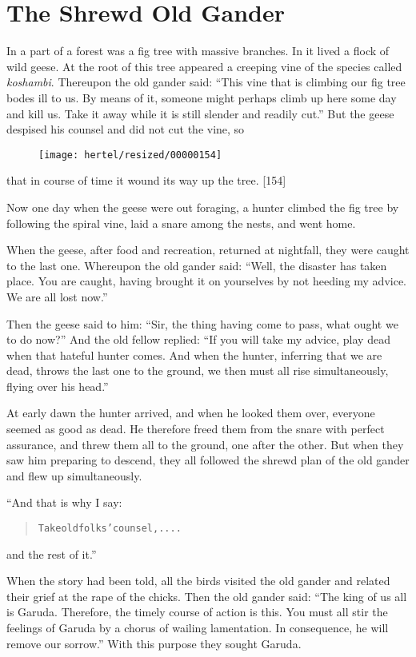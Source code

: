 \documentclass[article, twoside, 10pt]{memoir}
\renewenvironment{verbatim}{%
\begin{quote}%
\vskip -10pt%
\begin{alltt}\normalfont\small}{\end{alltt}%
\end{quote}%
\vskip -10pt
} %
\begin{document}
\chapter{The Shrewd Old Gander}

In a part of a forest was a fig tree with massive branches. In it
lived a flock of wild geese. At the root of this tree appeared a
creeping vine of the species called \emph{koshambi}. Thereupon the
old gander said:
``This vine that is climbing our fig tree bodes ill to us. By means of it, someone might perhaps climb up here some day and kill us. Take it away while it is still slender and readily cut.''
But the geese despised his counsel and did not cut the vine, so
\begin{figure}[p]\texttt{[image: hertel/resized/00000154]}\end{figure}that in course of time it wound its way up the tree. [154]

Now one day when the geese were out foraging, a hunter climbed the
fig tree by following the spiral vine, laid a snare among the
nests, and went home.

When the geese, after food and recreation, returned at nightfall,
they were caught to the last one. Whereupon the old gander said:
``Well, the disaster has taken place. You are caught, having brought it on yourselves by not heeding my advice. We are all lost now.''

Then the geese said to him:
``Sir, the thing having come to pass, what ought we to do now?''
And the old fellow replied:
``If you will take my advice, play dead when that hateful hunter comes. And when the hunter, inferring that we are dead, throws the last one to the ground, we then must all rise simultaneously, flying over his head.''

At early dawn the hunter arrived, and when he looked them over,
everyone seemed as good as dead. He therefore freed them from the
snare with perfect assurance, and threw them all to the ground, one
after the other. But when they saw him preparing to descend, they
all followed the shrewd plan of the old gander and flew up
simultaneously.

“And that is why I say:

\begin{verbatim}
Take old folks' counsel, ....
\end{verbatim}
and the rest of it.”

When the story had been told, all the birds visited the old gander
and related their grief at the rape of the chicks. Then the old
gander said:
``The king of us all is Garuda. Therefore, the timely course of action is this. You must all stir the feelings of Garuda by a chorus of wailing lamentation. In consequence, he will remove our sorrow.''
With this purpose they sought Garuda.
\end{document}
